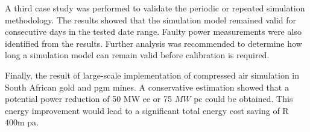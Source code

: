 \par
A third case study was performed to validate the periodic or repeated simulation methodology. The results showed that the simulation model remained valid for consecutive days in the tested date range. Faulty power measurements were also identified from the results. Further analysis was recommended to determine how long a simulation model can remain valid before calibration is required.
\par 
Finally, the result of large-scale implementation of compressed air simulation in South African gold and \gls{pgm} mines. A conservative estimation showed that a potential power reduction of 50 MW \gls{ee} or 75 $ MW $ \gls{pc} could be obtained. This energy improvement would lead to a significant total energy cost saving of R 400m \gls{pa}.
